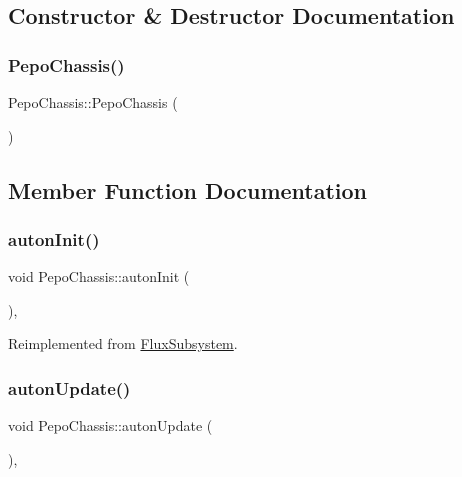 \subsection{Constructor \& Destructor Documentation}
\mbox{\label{classPepoChassis_a5915627651b6f2731ec21834c17e9dbe}} 
\subsubsection{\texorpdfstring{Pepo\+Chassis()}{PepoChassis()}}
{\footnotesize\ttfamily Pepo\+Chassis\+::\+Pepo\+Chassis (\begin{DoxyParamCaption}{ }\end{DoxyParamCaption})}



\subsection{Member Function Documentation}
\mbox{\label{classPepoChassis_a10380f1dad79ff1daa295d0673a1051f}} 
\subsubsection{\texorpdfstring{auton\+Init()}{autonInit()}}
{\footnotesize\ttfamily void Pepo\+Chassis\+::auton\+Init (\begin{DoxyParamCaption}{ }\end{DoxyParamCaption})\hspace{0.3cm}{\ttfamily [override]}, {\ttfamily [virtual]}}



Reimplemented from \hyperlink{classFluxSubsystem_a142cb34f612412e26bd0049e037dbe60}{Flux\+Subsystem}.

\mbox{\label{classPepoChassis_ab1e73685898517c8fa2f81c5c7a6a56c}} 
\subsubsection{\texorpdfstring{auton\+Update()}{autonUpdate()}}
{\footnotesize\ttfamily void Pepo\+Chassis\+::auton\+Update (\begin{DoxyParamCaption}{ }\end{DoxyParamCaption})\hspace{0.3cm}{\ttfamily [override]}, {\ttfamily [virtual]}}



